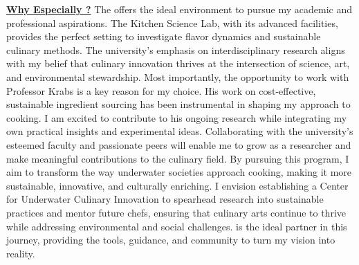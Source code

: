 
\textbf{\underline{Why Especially \GetUniversityAbbr?}}
The \GetUniversityName offers the ideal environment to pursue my academic and professional aspirations. The Kitchen Science Lab, with its advanced facilities, provides the perfect setting to investigate flavor dynamics and sustainable culinary methods. The university's emphasis on interdisciplinary research aligns with my belief that culinary innovation thrives at the intersection of science, art, and environmental stewardship.
Most importantly, the opportunity to work with Professor Krabs is a key reason for my choice. His work on cost-effective, sustainable ingredient sourcing has been instrumental in shaping my approach to cooking. I am excited to contribute to his ongoing research while integrating my own practical insights and experimental ideas. Collaborating with the university's esteemed faculty and passionate peers will enable me to grow as a researcher and make meaningful contributions to the culinary field.
By pursuing this program, I aim to transform the way underwater societies approach cooking, making it more sustainable, innovative, and culturally enriching. I envision establishing a Center for Underwater Culinary Innovation to spearhead research into sustainable practices and mentor future chefs, ensuring that culinary arts continue to thrive while addressing environmental and social challenges. \GetUniversityName is the ideal partner in this journey, providing the tools, guidance, and community to turn my vision into reality.
